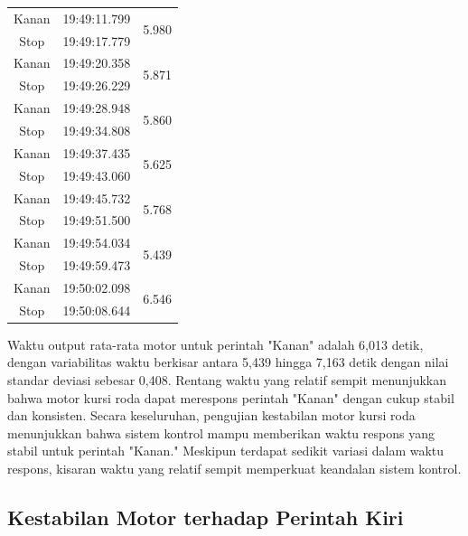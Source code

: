 \begin{longtable}{|c|c|c|}
  Kanan          & 19:49:11.799        & \multirow{2}{*}{5.980}  \\ \cline{1-2}
  Stop           & 19:49:17.779        &                         \\ \hline
  Kanan          & 19:49:20.358        & \multirow{2}{*}{5.871}  \\ \cline{1-2}
  Stop           & 19:49:26.229        &                         \\ \hline
  Kanan          & 19:49:28.948        & \multirow{2}{*}{5.860}  \\ \cline{1-2}
  Stop           & 19:49:34.808        &                         \\ \hline
  Kanan          & 19:49:37.435        & \multirow{2}{*}{5.625}  \\ \cline{1-2}
  Stop           & 19:49:43.060        &                         \\ \hline
  Kanan          & 19:49:45.732        & \multirow{2}{*}{5.768}  \\ \cline{1-2}
  Stop           & 19:49:51.500        &                         \\ \hline
  Kanan          & 19:49:54.034        & \multirow{2}{*}{5.439}  \\ \cline{1-2}
  Stop           & 19:49:59.473        &                         \\ \hline
  Kanan          & 19:50:02.098        & \multirow{2}{*}{6.546}  \\ \cline{1-2}
  Stop           & 19:50:08.644        &                         \\ \hline
\end{longtable}

\newpage

Waktu output rata-rata motor untuk perintah "Kanan" adalah 6,013 detik, dengan variabilitas waktu berkisar antara 5,439 hingga 7,163 detik dengan nilai standar deviasi sebesar 0,408. Rentang waktu yang relatif sempit menunjukkan bahwa motor kursi roda dapat merespons perintah "Kanan" dengan cukup stabil dan konsisten. Secara keseluruhan, pengujian kestabilan motor kursi roda menunjukkan bahwa sistem kontrol mampu memberikan waktu respons yang stabil untuk perintah "Kanan." Meskipun terdapat sedikit variasi dalam waktu respons, kisaran waktu yang relatif sempit memperkuat keandalan sistem kontrol.

\subsection{Kestabilan Motor terhadap Perintah Kiri}

